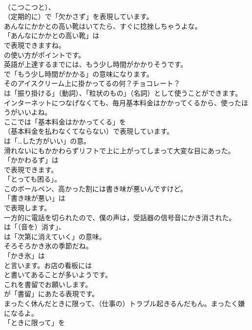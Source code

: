 \documentclass[8pt]{extreport}
\begin{document}
\begin{CJK}{UTF8}{min}
\\	（こつこつと）、
\\	（定期的に）で「欠かさず」を表現しています。	
\\	あんなにかかとの高い靴はいてたら、すぐに捻挫しちゃうよな。 
\\	「あんなにかかとの高い靴」は
\\	で表現できますね。
\\	の使い方がポイントです。	
\\	英語が上達するまでには、もう少し時間がかかりそうです。 
\\	で「もう少し時間がかかる」の意味になります。	
\\	そのアイスクリーム上に掛かってるの何？チョコレート？ 
\\	は「振り掛ける」（動詞）、「粒状のもの」（名詞）として使うことができます。	
\\	インターネットにつなげなくても、毎月基本料金はかかってくるから、使ったほうがいいよね。 
\\	ここでは「基本料金はかかってくる」を 
\\	（基本料金を払わなくてならない）で表現しています。
\\	は「…した方がいい」の意。	
\\	滑れないにもかかわらずリフトで上に上がってしまって大変な目にあった。 
\\	「かかわるず」は
\\	で表現できます。
\\	「とっても困る」。	
\\	このボールペン、高かった割には書き味が悪いんですけど。 
\\	「書き味が悪い」は
\\	で表現します。	
\\	一方的に電話を切られたので、僕の声は，受話器の信号音にかき消された。 
\\	は「（音を）消す」、
\\	は「次第に消えていく」の意味。	
\\	そろそろかき氷の季節だね。 
\\	「かき氷」は
\\	と言います。お店の看板には
\\	と書いてあることが多いようです。	
\\	これを書留でお願いします。 
\\	が「書留」にあたる表現です。	
\\	まったく休んだときに限って、（仕事の）トラブル起きるんだもん。まったく嫌になるよ。 
\\	「ときに限って」を

\end{CJK}
\end{document}
